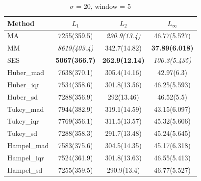 \documentclass[letterpaper,12pt]{article}
\begin{document}
{%
\begin{table}[H]
\small
\centering
\caption{$\sigma$ = 20, window = 5}
\vspace{-2mm}
\label{tab:s20w5}
\begin{tabular}{lccc}
\toprule
Method      & $L_1$             & $L_2$             & $L_\infty$       \\
\midrule
MA          & 7255(359.5)       & \textit{290.9(13.4)} & 46.77(5.527)     \\
MM          & \textit{8619(403.4)} & 342.7(14.82) & \textbf{37.89(6.018)} \\
SES         & \textbf{5067(366.7)} & \textbf{262.9(12.14)} & \textit{100.3(5.435)} \\
Huber\_mad  & 7638(370.1)       & 305.4(14.16)      & 42.97(6.3)       \\
Huber\_iqr  & 7534(358.6)       & 301.8(13.56)      & 46.25(5.593)     \\
Huber\_sd   & 7288(356.9)       & 292(13.46)        & 46.52(5.5)       \\
Tukey\_mad  & 7944(382.9)       & 319.1(14.59)      & 43.15(6.097)     \\
Tukey\_iqr  & 7769(356.1)       & 311.5(13.57)      & 45.32(5.606)     \\
Tukey\_sd   & 7288(358.3)       & 291.7(13.48)      & 45.24(5.645)     \\
Hampel\_mad & 7583(375.6)       & 304.5(14.35)      & 45.17(6.318)     \\
Hampel\_iqr & 7524(361.9)       & 301.8(13.63)      & 46.55(5.413)     \\
Hampel\_sd  & 7255(359.5)       & 290.9(13.4)       & 46.77(5.527)     \\
\bottomrule
\end{tabular}
\end{table}
\vspace{-6mm}

}
\end{document}

